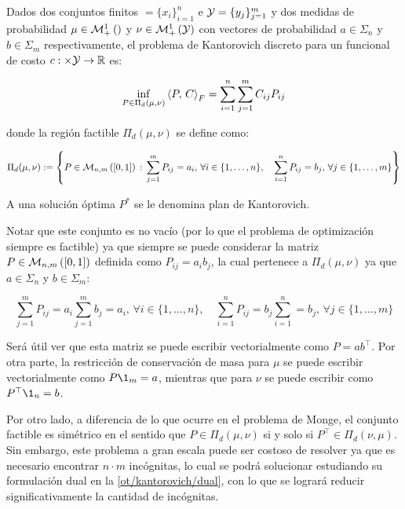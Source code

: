 \begin{defn}
	Dados dos conjuntos finitos $\xspace=\{x_i\}_{i=1}^n$ e $\mathcal{Y}=\{y_j\}_{j=1}^m$ y dos medidas de probabilidad $\mu\in\mathcal{M}_+^1\left(\right)$ y $\nu\in\mathcal{M}_+^1\left(\mathcal{Y}\right)$ con vectores de probabilidad $a\in\Sigma_n$ y $b\in\Sigma_m$ respectivamente, el problema de Kantorovich discreto para un funcional de costo $c:\times\mathcal{Y}\to\mathbb{R}$ es:

	\begin{equation}
		\label{eq:kantorovich_discrete}
		\inf_{P\in \Pi_d(\mu,\nu)} \left\langle P,\,C\right\rangle_F = \sum_{i=1}^{n}\sum_{j=1}^{m} C_{ij}P_{ij}
	\end{equation}

	donde la región factible $\Pi_d(\mu,\nu)$ se define como:

	\begin{equation}
		\label{eq:coupling_discrete}
		\Pi_d(\mu,\nu) := \left\{P\in\mathcal{M}_{n,m}\left([0,1]\right)\,:\,
		\sum_{j=1}^m P_{ij} = a_i,\, \forall i\in\{1,\ldots,n\},\quad
		\sum_{i=1}^n P_{ij} = b_j,\, \forall j\in\{1,\ldots,m\}
		\right\}
	\end{equation}

	A una solución óptima $P^*$ se le denomina plan de Kantorovich.
\end{defn}

Notar que este conjunto es no vacío (por lo que el problema de optimización siempre es factible) ya que siempre se puede considerar la matriz $P\in\mathcal{M}_{n,m}\left([0,1]\right)$ definida como $P_{ij}=a_ib_j$, la cual pertenece a $\Pi_d(\mu,\nu)$ ya que $a\in\Sigma_n$ y $b\in\Sigma_m$:

\begin{equation}
	\sum_{j=1}^m P_{ij} = a_i\sum_{j=1}^m b_j = a_i,\, \forall i\in\{1,\ldots,n\},\quad
	\sum_{i=1}^n P_{ij} = b_j\sum_{i=1}^n = b_j,\, \forall j\in\{1,\ldots,m\}
\end{equation}

Será útil ver que esta matriz se puede escribir vectorialmente como $P=ab^\top$. Por otra parte, la restricción de conservación de masa para $\mu$ se puede escribir vectorialmente como $P\1_{m}=a$, mientras que para $\nu$ se puede escribir como $P^\top \1_n = b$.

Por otro lado, a diferencia de lo que ocurre en el problema de Monge, el conjunto factible es simétrico en el sentido que $P\in \Pi_d(\mu,\nu)$ si y solo si $P^\top \in \Pi_d(\nu,\mu)$. Sin embargo, este problema a gran escala puede ser costoso de resolver ya que es necesario encontrar $n\cdot m$ incógnitas, lo cual se podrá solucionar estudiando su formulación dual en la \autoref{ot/kantorovich/dual}, con lo que se logrará reducir significativamente la cantidad de incógnitas.

